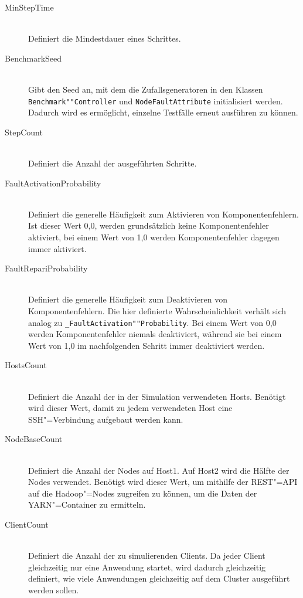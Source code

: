 \begin{description}
    \item [MinStepTime] \hfill \\
        Definiert die Mindestdauer eines Schrittes.
        
    \item[BenchmarkSeed] \hfill \\
        Gibt den Seed an, mit dem die Zufallsgeneratoren in den Klassen \texttt{Benchmark""Controller} und \texttt{NodeFaultAttribute} initialisiert werden.
        Dadurch wird es ermöglicht, einzelne Testfälle erneut ausführen zu können.
        
    \item[StepCount] \hfill \\
        Definiert die Anzahl der ausgeführten Schritte.
        
    \item[FaultActivationProbability] \hfill \\
        Definiert die generelle Häufigkeit zum Aktivieren von Komponentenfehlern.
        Ist dieser Wert 0,0, werden grundsätzlich keine Komponentenfehler aktiviert, bei einem Wert von 1,0 werden Komponentenfehler dagegen immer aktiviert.
        
    \item[FaultRepariProbability] \hfill \\
        Definiert die generelle Häufigkeit zum Deaktivieren von Komponentenfehlern.
        Die hier definierte Wahrscheinlichkeit verhält sich analog zu \texttt{\_FaultActivation""Probability}.
        Bei einem Wert von 0,0 werden Komponentenfehler niemals deaktiviert, während sie bei einem Wert von 1,0 im nachfolgenden Schritt immer deaktiviert werden.
        
    \item[HostsCount] \hfill \\
        Definiert die Anzahl der in der Simulation verwendeten Hosts.
        Benötigt wird dieser Wert, damit zu jedem verwendeten Host eine SSH"=Verbindung aufgebaut werden kann.
        
    \item[NodeBaseCount] \hfill \\
        Definiert die Anzahl der Nodes auf Host1.
        Auf Host2 wird die Hälfte der Nodes verwendet.
        Benötigt wird dieser Wert, um mithilfe der REST"=API auf die Hadoop"=Nodes zugreifen zu können, um die Daten der YARN"=Container zu ermitteln.
        
    \item[ClientCount] \hfill \\
        Definiert die Anzahl der zu simulierenden Clients.
        Da jeder Client gleichzeitig nur eine Anwendung startet, wird dadurch gleichzeitig definiert, wie viele Anwendungen gleichzeitig auf dem Cluster ausgeführt werden sollen.
\end{description}

